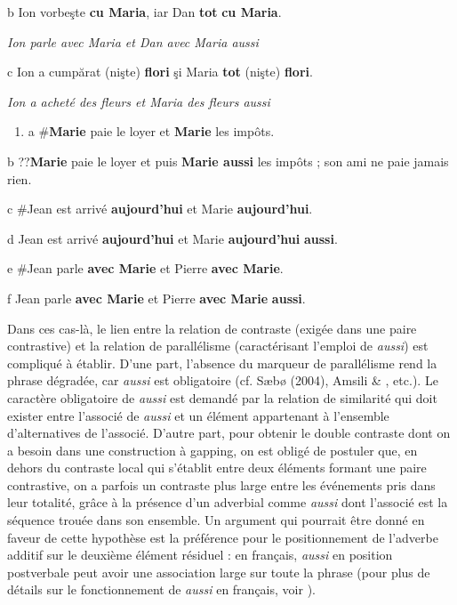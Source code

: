   b  Ion vorbeşte \textbf{cu Maria}, iar Dan \textbf{tot} \textbf{cu Maria}. 

    \textit{Ion parle avec Maria et Dan avec Maria aussi}

  c  Ion a cumpărat (nişte) \textbf{flori} şi Maria \textbf{tot} (nişte) \textbf{flori}. 

    \textit{Ion a acheté des fleurs et Maria des fleurs aussi } 


\begin{enumerate}
\item \label{bkm:Ref299633649}a   \#\textbf{Marie} paie le loyer et \textbf{Marie} les impôts.


\end{enumerate}
b  ??\textbf{Marie} paie le loyer et puis \textbf{Marie aussi} les impôts ; son ami ne paie jamais rien.

c  \#Jean est arrivé \textbf{aujourd'hui} et Marie \textbf{aujourd'hui}.

d  Jean est arrivé \textbf{aujourd'hui} et Marie \textbf{aujourd'hui} \textbf{aussi}.

e  \#Jean parle \textbf{avec Marie} et Pierre \textbf{avec Marie}.

f  Jean parle \textbf{avec Marie} et Pierre \textbf{avec Marie} \textbf{aussi}.

Dans ces cas-là, le lien entre la relation de contraste (exigée dans une paire contrastive) et la relation de parallélisme (caractérisant l'emploi de \textit{aussi}) est compliqué à établir. D'une part, l'absence du marqueur de parallélisme rend la phrase dégradée, car \textit{aussi} est obligatoire (cf. S{\ae}b{\o} (2004), Amsili \& \citet{Beyssade2009}, etc.). Le caractère obligatoire de \textit{aussi} est demandé par la relation de similarité qui doit exister entre l'associé de \textit{aussi} et un élément appartenant à l'ensemble d'alternatives de l'associé. D'autre part, pour obtenir le double contraste dont on a besoin dans une construction à gapping, on est obligé de postuler que, en dehors du contraste local qui s'établit entre deux éléments formant une paire contrastive, on a parfois un contraste plus large entre les événements pris dans leur totalité, grâce à la présence d'un adverbial comme \textit{aussi} dont l'associé est la séquence trouée dans son ensemble. Un argument qui pourrait être donné en faveur de cette hypothèse est la préférence pour le positionnement de l'adverbe additif sur le deuxième élément résiduel : en français, \textit{aussi} en position postverbale peut avoir une association large sur toute la phrase (pour plus de détails sur le fonctionnement de \textit{aussi} en français, voir \citet{Winterstein2010}).

